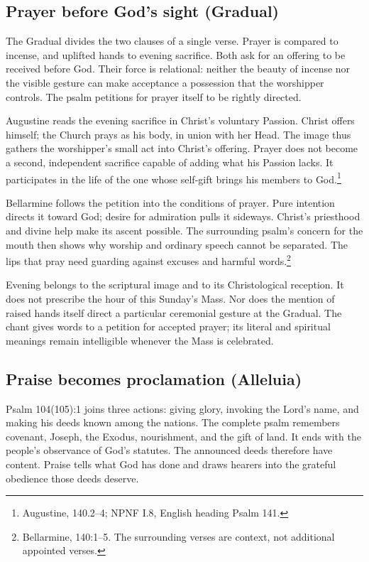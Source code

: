 \subsection{Prayer before God's sight (Gradual)}

The Gradual divides the two clauses of a single verse. Prayer is compared
to incense, and uplifted hands to evening sacrifice. Both ask for an
offering to be received before God. Their force is relational: neither
the beauty of incense nor the visible gesture can make acceptance a
possession that the worshipper controls. The psalm petitions for prayer
itself to be rightly directed.

Augustine reads the evening sacrifice in Christ's voluntary Passion.
Christ offers himself; the Church prays as his body, in union with her
Head. The image thus gathers the worshipper's small act into Christ's
offering. Prayer does not become a second, independent sacrifice capable
of adding what his Passion lacks. It participates in the life of the one
whose self-gift brings his members to God.\footnote{Augustine,
 140.2--4; NPNF I.8, English heading Psalm 141.}

Bellarmine follows the petition into the conditions of prayer. Pure
intention directs it toward God; desire for admiration pulls it sideways.
Christ's priesthood and divine help make its ascent possible. The
surrounding psalm's concern for the mouth then shows why worship and
ordinary speech cannot be separated. The lips that pray need guarding
against excuses and harmful words.\footnote{Bellarmine, 
140:1--5. The surrounding verses are context, not additional appointed
verses.}

Evening belongs to the scriptural image and to its Christological
reception. It does not prescribe the hour of this Sunday's Mass. Nor does
the mention of raised hands itself direct a particular ceremonial gesture
at the Gradual. The chant gives words to a petition for accepted prayer;
its literal and spiritual meanings remain intelligible whenever the Mass
is celebrated.

\subsection{Praise becomes proclamation (Alleluia)}

Psalm 104(105):1 joins three actions: giving glory, invoking the Lord's
name, and making his deeds known among the nations. The complete psalm
remembers covenant, Joseph, the Exodus, nourishment, and the gift of land.
It ends with the people's observance of God's statutes. The announced
deeds therefore have content. Praise tells what God has done and draws
hearers into the grateful obedience those deeds deserve.

